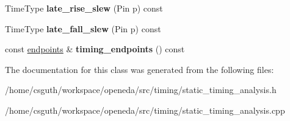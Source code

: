 \begin{DoxyCompactItemize}
\item 
\hypertarget{classophidian_1_1timing_1_1static__timing__analysis_aad5216c335999dee985a8d8048b557a5}{Time\-Type {\bfseries late\-\_\-rise\-\_\-slew} (Pin p) const }\label{classophidian_1_1timing_1_1static__timing__analysis_aad5216c335999dee985a8d8048b557a5}

\item 
\hypertarget{classophidian_1_1timing_1_1static__timing__analysis_a4c9b7ea2e367a8557f8e77410a4c0bf3}{Time\-Type {\bfseries late\-\_\-fall\-\_\-slew} (Pin p) const }\label{classophidian_1_1timing_1_1static__timing__analysis_a4c9b7ea2e367a8557f8e77410a4c0bf3}

\item 
\hypertarget{classophidian_1_1timing_1_1static__timing__analysis_ac03ee85b1021876ad1b8ba8f4a0bf64d}{const \hyperlink{classophidian_1_1timing_1_1endpoints}{endpoints} \& {\bfseries timing\-\_\-endpoints} () const }\label{classophidian_1_1timing_1_1static__timing__analysis_ac03ee85b1021876ad1b8ba8f4a0bf64d}

\end{DoxyCompactItemize}


The documentation for this class was generated from the following files\-:\begin{DoxyCompactItemize}
\item 
/home/csguth/workspace/openeda/src/timing/static\-\_\-timing\-\_\-analysis.\-h\item 
/home/csguth/workspace/openeda/src/timing/static\-\_\-timing\-\_\-analysis.\-cpp\end{DoxyCompactItemize}
